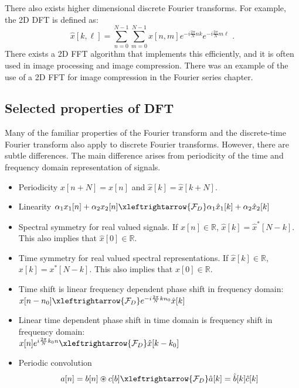 There also exists higher dimensional discrete Fourier transforms. For example, the 2D DFT is defined as:
\begin{equation}
  \hat{x}[k,\ell] = \sum_{n=0}^{N-1}\sum_{m=0}^{N-1} x[n,m] e^{-i \frac{2\pi}{N}nk }e^{-i \frac{2\pi}{N}m\ell } \,\,.
\end{equation}
There exists a 2D FFT algorithm that implements this efficiently, and
it is often used in image processing and image compression. There was
an example of the use of a 2D FFT for image compression in the Fourier
series chapter.


\subsection{Selected properties of DFT}

Many of the familiar properties of the Fourier transform and the
discrete-time Fourier transform also apply to discrete Fourier
transforms. However, there are subtle differences. The main difference
arises from periodicity of the time and frequency domain
representation of signals.
\begin{itemize}
\item Periodicity $x[n+N]=x[n]$ and $\hat{x}[k]=\hat{x}[k+N]$.
\item Linearity $\alpha_1 x_1[n] + \alpha_2x_2[n] \xleftrightarrow{\mathcal{F}_D} \alpha_1 \hat{x}_1[k] + \alpha_2 \hat{x}_2[k]$

\item Spectral symmetry for real valued signals. If $x[n] \in \mathbb{R}$, $\hat{x}[k]=\hat{x}^*[N-k]$. This also implies that $\hat{x}[0]\in \mathbb{R}$.

\item Time symmetry for real valued spectral representations. If $\hat{x}[k] \in \mathbb{R}$, $x[k]=x^*[N-k]$. This also implies that $x[0]\in \mathbb{R}$.

\item Time shift is linear frequency dependent phase shift in frequency domain:\\ $x[n-n_0]\xleftrightarrow{\mathcal{F}_D} e^{-i\frac{2\pi}{N}k n_0}\hat{x}[k]$
\item Linear time dependent phase shift in time domain is frequency shift in frequency domain:\\ $x[n]e^{i\frac{2\pi}{N}k_0 n} \xleftrightarrow{\mathcal{F}_D} \hat{x}[k-k_0]$
\item Periodic convolution
\begin{equation}
a[n]=b[n]\circledast c[b]\xleftrightarrow{\mathcal{F}_D} \hat{a}[k]=\hat{b}[k]\hat{c}[k]
\end{equation}
\end{itemize}
\fi 
